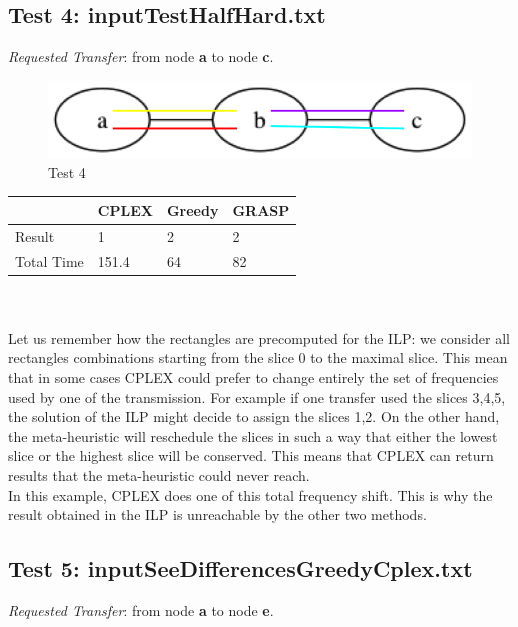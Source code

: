 \documentclass[11pt,a4paper]{article}
\begin{document}
\subsection{Test 4: inputTestHalfHard.txt}

\textit{Requested Transfer}: from node \textbf{a} to node \textbf{c}.\\

\begin{figure}[H]
  \centering
    \includegraphics[scale=0.7]{inputTestHalfHard.png}
  \caption{Test 4}
  \label{fig:test4}
\end{figure}

\begin{tabular}{| l | l | l | l |}
\hline
 & CPLEX & Greedy & GRASP \\ \hline
Result & 1 & 2 & 2 \\ \hline
Total Time & 151.4 & 64 & 82 \\ \hline
\end{tabular}\\\\

Let us remember how the rectangles are precomputed for the ILP: we consider all rectangles combinations starting from the slice 0 to the maximal slice. This mean that in some cases CPLEX could prefer to change entirely the set of frequencies used by one of the transmission. For example if one transfer used the slices 3,4,5, the solution of the ILP might decide to assign the slices 1,2.  On the other hand, the meta-heuristic will reschedule the slices in such a way that either the lowest slice or the highest slice will be conserved. This means that CPLEX can return results that the meta-heuristic could never reach.\\

In this example, CPLEX does one of this total frequency shift. This is why the result obtained in the ILP is unreachable by the other two methods.

\subsection{Test 5: inputSeeDifferencesGreedyCplex.txt}

\textit{Requested Transfer}: from node \textbf{a} to node \textbf{e}.\\
\end{document}
